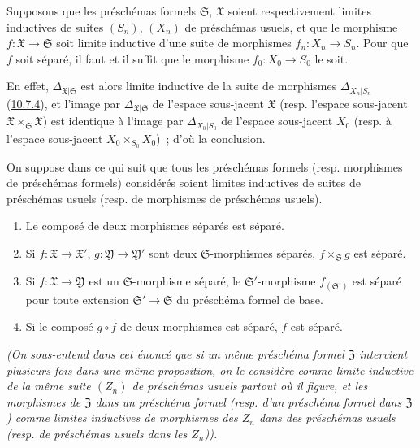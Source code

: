 \begin{proposition}[10.15.2]
\label{I.10.15.2-fr}
Supposons que les préschémas formels $\mathfrak{S}$, $\mathfrak{X}$ soient
respectivement limites inductives de suites $(S_n)$, $(X_n)$ de
préschémas usuels, et que le morphisme
$f:\mathfrak{X}\to\mathfrak{S}$ soit limite inductive d'une suite de
morphismes $f_n:X_n\to S_n$. Pour que $f$ soit séparé, il faut et il suffit
que le morphisme $f_0:X_0\to S_0$ le soit.
\end{proposition}

En effet, $\Delta_{\mathfrak{X}|\mathfrak{S}}$ est alors limite inductive de
la suite de morphismes $\Delta_{X_n|S_n}$
(\hyperref[I.10.7.4-fr]{10.7.4}), et l'image par
$\Delta_{\mathfrak{X}|\mathfrak{S}}$ de l'espace sous-jacent
$\mathfrak{X}$ (resp. l'espace sous-jacent
$\mathfrak{X}\times_{\mathfrak{S}}\mathfrak{X}$) est identique à l'image
par $\Delta_{X_0|S_0}$ de l'espace sous-jacent $X_0$ (resp. à l'espace
sous-jacent $X_0\times_{S_0}X_0$)~; d'où la conclusion.

\begin{proposition}[10.15.3]
\label{I.10.15.3-fr}
On suppose dans ce qui suit que tous les préschémas formels \textup{(resp.}
morphismes de préschémas formels) considérés soient limites inductives de
suites de préschémas usuels \textup{(resp.} de morphismes de préschémas usuels).
\begin{enumerate}
  \item[\rm{(i)}] Le composé de deux morphismes séparés est séparé.
  \item[\rm{(ii)}] Si $f:\mathfrak{X}\to\mathfrak{X}'$,
  $g:\mathfrak{Y}\to\mathfrak{Y}'$ sont deux $\mathfrak{S}$-morphismes
  séparés, $f\times_{\mathfrak{S}}g$ est séparé.
  \item[\rm{(iii)}] Si $f:\mathfrak{X}\to\mathfrak{Y}$ est un
  $\mathfrak{S}$-morphisme séparé, le $\mathfrak{S}'$-morphisme
  $f_{(\mathfrak{S}')}$ est séparé pour toute extension
  $\mathfrak{S}'\to\mathfrak{S}$ du préschéma formel de base.
  \item[\rm{(iv)}] Si le composé $g\circ f$ de deux morphismes est séparé,
  $f$ est séparé.
\end{enumerate}
\emph{(On sous-entend dans cet énoncé que si un même préschéma formel
$\mathfrak{Z}$ intervient plusieurs fois dans une même proposition, on le
considère comme limite inductive de la \emph{même} suite $(Z_n)$ de
préschémas usuels partout où il figure, et les morphismes de $\mathfrak{Z}$
dans un préschéma formel (resp. d'un préschéma formel dans $\mathfrak{Z}$)
comme limites inductives de morphismes des $Z_n$ dans des préschémas usuels
(resp. de préschémas usuels dans les $Z_n$)).}
\end{proposition}

